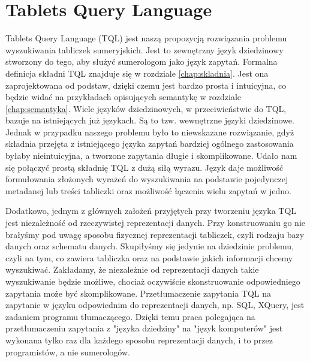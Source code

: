 \section{Tablets Query Language}

Tablets Query Language (TQL) jest naszą propozycją rozwiązania problemu wyszukiwania tabliczek sumeryjskich.
Jest to zewnętrzny język dziedzinowy stworzony do tego, aby służyć sumerologom jako język zapytań.
Formalna definicja składni TQL znajduje się w rozdziale \ref{chap:skladnia}.
Jest ona zaprojektowana od podstaw, dzięki czemu jest bardzo prosta i intuicyjna, co będzie widać na przykładach 
opisujących semantykę w rozdziale \ref{chap:semantyka}. 
Wiele języków dziedzinowych, w przeciwieństwie do TQL, bazuje na istniejących już językach. Są to tzw. wewnętrzne języki dziedzinowe. Jednak w przypadku naszego problemu było to niewskazane rozwiązanie, gdyż składnia przejęta z istniejącego języka zapytań bardziej ogólnego zastosowania byłaby nieintuicyjna, a tworzone zapytania długie i skomplikowane.
Udało nam się połączyć prostą składnię TQL z dużą siłą wyrazu.
 Język daje możliwość formułowania złożonych 
wyrażeń do wyszukiwania na podstawie pojedynczej
metadanej lub treści tabliczki oraz możliwość łączenia wielu zapytań w jedno.

Dodatkowo, jednym z głównych założeń przyjętych przy tworzeniu języka TQL jest niezależność od rzeczywistej
reprezentacji danych. Przy konstruowaniu go nie brałyśmy pod uwagę sposobu fizycznej reprezentacji tabliczek,
czyli rodzaju bazy danych oraz schematu danych. Skupiłyśmy się jedynie na dziedzinie problemu, czyli na tym,
co zawiera tabliczka oraz na podstawie jakich informacji chcemy wyszukiwać. Zakładamy, że niezależnie od
reprezentacji danych takie wyszukiwanie będzie możliwe, chociaż oczywiście skonstruowanie odpowiedniego
zapytania może być skomplikowane. Przetłumaczenie zapytania TQL na zapytanie w języku odpowiednim do
reprezentacji danych, np. SQL, XQuery, jest zadaniem programu tłumaczącego. Dzięki temu praca polegająca
na przetłumaczeniu zapytania z "języka dziedziny" na "język komputerów" jest wykonana tylko raz dla każdego
sposobu reprezentacji danych, i to przez programistów, a nie sumerologów.


